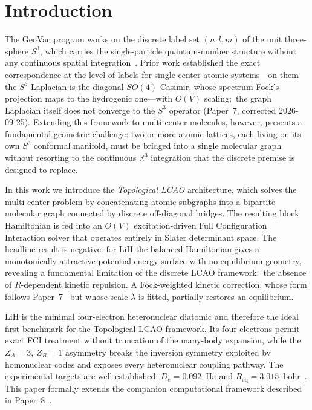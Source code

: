 \documentclass[aps,pra,twocolumn,superscriptaddress,longbibliography]{revtex4-2}
\begin{document}
\maketitle

\section{Introduction}
\label{sec:intro}

The GeoVac program works on the discrete label set $(n,l,m)$ of the
unit three-sphere $S^3$, which carries the single-particle
quantum-number structure without any continuous spatial
integration~\cite{paper0,paper1,paper7}.  Prior work established the
exact correspondence at the level of labels for single-center atomic
systems---on them the $S^3$ Laplacian is the diagonal $SO(4)$ Casimir,
whose spectrum Fock's projection maps to the hydrogenic one---with $O(V)$
scaling;\ the graph Laplacian itself does not converge to the $S^3$
operator (Paper~7, corrected 2026-09-25).  Extending this framework to multi-center molecules, however,
presents a fundamental geometric challenge: two or more atomic lattices,
each living on its own $S^3$ conformal manifold, must be bridged into a
single molecular graph without resorting to the continuous
$\mathbb{R}^3$ integration that the discrete premise is designed to
replace.

In this work we introduce the \emph{Topological LCAO} architecture,
which solves the multi-center problem by concatenating atomic subgraphs
into a bipartite molecular graph connected by discrete off-diagonal
bridges.  The resulting block Hamiltonian is fed into an $O(V)$
excitation-driven Full Configuration Interaction solver that operates
entirely in Slater determinant space.  The headline result is negative:
for LiH the balanced Hamiltonian gives a monotonically attractive
potential energy surface with no equilibrium geometry, revealing a
fundamental limitation of the discrete LCAO framework:\ the absence of
$R$-dependent kinetic repulsion.  A Fock-weighted kinetic correction,
whose form follows Paper~7~\cite{paper7} but whose scale $\lambda$ is
fitted, partially restores an equilibrium.

LiH is the minimal four-electron heteronuclear diatomic and therefore
the ideal first benchmark for the Topological LCAO framework.  Its four
electrons permit exact FCI treatment without truncation of the many-body
expansion, while the $Z_A=3$, $Z_B=1$ asymmetry breaks the inversion
symmetry exploited by homonuclear codes and exposes every heteronuclear
coupling pathway.  The experimental targets are well-established:
$D_e = 0.092$~Ha and $R_{\mathrm{eq}}=3.015$~bohr~\cite{huber}.  This
paper formally extends the companion computational framework described
in Paper~8~\cite{paper8}.
\end{document}

